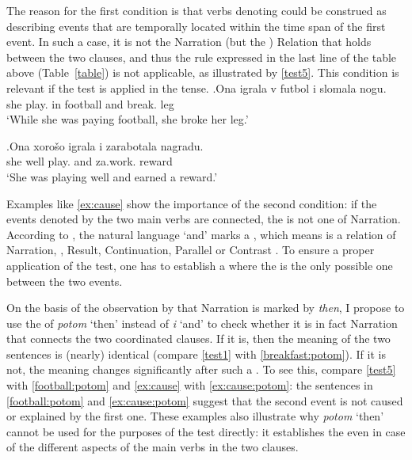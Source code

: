The reason for the first condition is that verbs denoting  could be construed as describing events that are temporally located within the time span of the first event. In such a case, it is not the Narration (but the ) Relation that holds between the two clauses, and thus the rule expressed in the last line of the table above (Table~\ref{table}) is not applicable, as illustrated by \ref{test5}. This condition is relevant if the test is applied in the  tense.
\exg.\label{test5}Ona igrala\textsuperscript{\IPF} v futbol i slomala\textsuperscript{\PF} nogu.\\
she play. in football and break. leg\\
\trans `While she was paying football, she broke her leg.'

\exg.\label{ex:cause}Ona xoro\v{s}o igrala\textsuperscript{\IPF} i zarabotala\textsuperscript{\PF} nagradu.\\
she well play. and za.work. reward\\
\trans `She was playing well and earned a reward.'

Examples like \ref{ex:cause} show the importance of the second condition: if the events denoted by the two main verbs are connected, the  is not one of Narration. According to \citet{Txurruka:03}, the natural language  `and' marks a , which means is a relation of Narration, , Result, Continuation, Parallel or Contrast \citep{Asher:05}. To ensure a proper application of the test, one has to establish a  where the  is the only possible one between the two events. 

On the basis of the observation by \citet{Txurruka:03} that Narration is marked by \textit{then}, I propose to use the  of \textit{potom} `then' instead of \textit{i} `and' to check whether it is in fact Narration that connects the two coordinated clauses. If it is, then the meaning of the two sentences is (nearly) identical (compare \ref{test1} with \ref{breakfast:potom}). If it is not, the meaning changes significantly after such a . To see this, compare \ref{test5} with \ref{football:potom} and \ref{ex:cause} with \ref{ex:cause:potom}: the sentences in \ref{football:potom} and \ref{ex:cause:potom} suggest that the second event is not caused or explained by the first one. These examples also illustrate why \textit{potom} `then' cannot be used for the purposes of the test directly: it establishes the  even in case of the different aspects of the main verbs in the two clauses.

